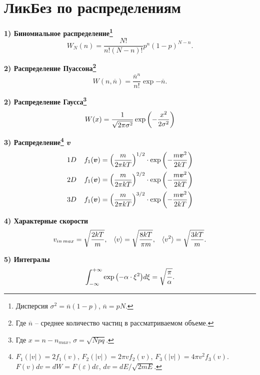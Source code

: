 \section{ЛикБез по распределениям}

\noindent
\textbf{1) Биномиальное распределение\footnote{
Дисперсия $\sigma^2 = \overline{n}(1-p)$, $\overline{n}=pN$.
}}
\begin{equation}
    W_N(n) = \frac{N!}{n!(N-n)!} p^n (1-p)^{N-n}.
\end{equation}


\noindent
\textbf{2) Распределение Пуассона\footnote{
Где $\overline{n}$ -- среднее количество частиц в рассматриваемом объеме.
}}
\begin{equation}
    W (n, \overline{n})= \frac{\overline{n}^n}{n!}\exp{-\overline{n}}.
\end{equation}

\noindent
\textbf{2) Распределение Гаусса\footnote{
Где $x = n - n_{max}$, $\sigma = \sqrt{Npq}$.
}}
\begin{equation}
    W(x) = \frac{1}{\sqrt{2 \pi \sigma^2}} \exp{\left( - \frac{x^2}{2 \sigma^2}\right)}
\end{equation}

\noindent
\textbf{3) Распределение\footnote{
$F_1(|v|)=2 f_1(v)$, $F_2(|v|)=2 \pi v f_2(v)$, $F_3(|v|)=4 \pi v^2 f_3(v)$. $F(v)dv=dW=F(\varepsilon) d \varepsilon$, $dv = dE/\sqrt{2mE}$.
} $\mbox{\boldmath $v$}$}
\begin{align}
    1D \; \; \; \;& f_1(\mbox{\boldmath $v$}) = \left( \frac{m}{2 \pi k T} \right)^{1/2} \cdot \exp{\left(-\frac{m \mbox{\boldmath $v$}^2}{2 k T}\right)} \\
    2D \; \; \; \;& f_1(\mbox{\boldmath $v$}) = \left( \frac{m}{2 \pi k T} \right)^{2/2} \cdot \exp{\left(-\frac{m \mbox{\boldmath $v$}^2}{2 k T}\right)} \\
    3D \; \; \; \;& f_1(\mbox{\boldmath $v$}) = \left( \frac{m}{2 \pi k T} \right)^{3/2} \cdot \exp{\left(-\frac{m \mbox{\boldmath $v$}^2}{2 k T}\right)}
\end{align}

\noindent
\textbf{4) Характерные скорости}
\begin{align}
    v_{in \, max} = \sqrt{\frac{2kT}{m}}, \; \; \;
    \langle v \rangle = \sqrt{\frac{8kT}{\pi m}}, \; \; \;
    \langle v^2 \rangle = \sqrt{\frac{3kT}{m}}.
\end{align}

\noindent
\textbf{5) Интегралы}
\begin{equation}
    \int_{- \infty}^{+ \infty} \exp{\left(- \alpha \cdot \xi^2\right)} d \xi = \sqrt{\frac{\pi}{\alpha}}.
\end{equation}
